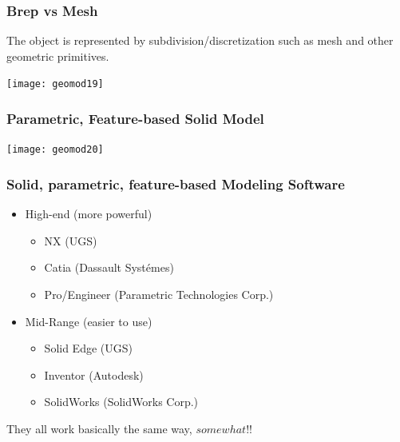 \begin{frame}[fragile]\frametitle{Brep vs Mesh  }

The object is represented by subdivision/discretization such as mesh and other geometric primitives.


			\begin{center}
	\texttt{[image: geomod19]}
			\end{center}
\end{frame}

\begin{frame}[fragile]\frametitle{Parametric, Feature-based Solid Model}


			\begin{center}
	\texttt{[image: geomod20]}
			\end{center}
\end{frame}

\begin{frame}[fragile]\frametitle{Solid, parametric, feature-based Modeling Software}

\begin{itemize}
\item High-end (more powerful)
\begin{itemize}

\item NX (UGS)
\item Catia (Dassault Systémes)
\item Pro/Engineer (Parametric Technologies Corp.)
\end{itemize}

\item Mid-Range (easier to use)
\begin{itemize}

\item Solid Edge (UGS)
\item Inventor (Autodesk)
\item SolidWorks (SolidWorks Corp.)
\end{itemize}
\end{itemize}

They all work basically the same way, $somewhat$!!

\end{frame}

